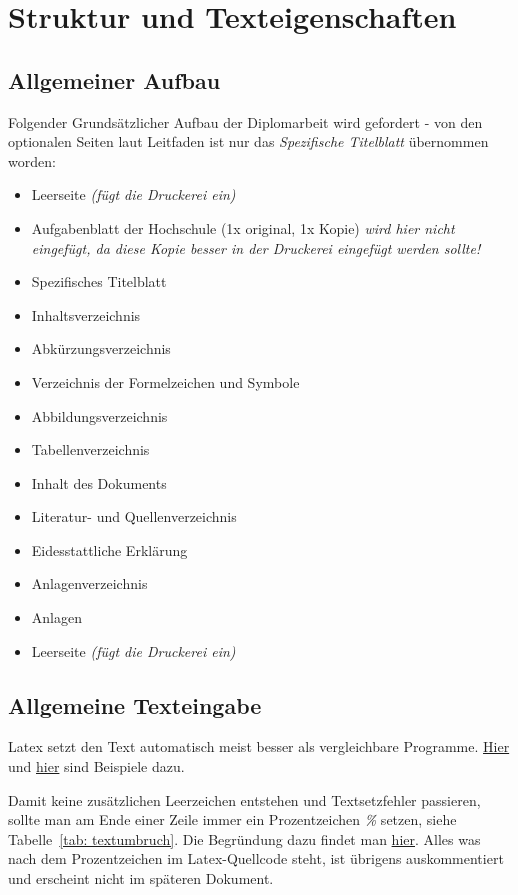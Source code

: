 \chapter{Struktur und Texteigenschaften}%
\section{Allgemeiner Aufbau}%
Folgender Grundsätzlicher Aufbau der Diplomarbeit wird gefordert - von den optionalen Seiten laut Leitfaden ist nur das \emph{Spezifische Titelblatt} übernommen worden:%
\begin{itemize}%
 \item Leerseite \emph{(fügt die Druckerei ein)}%
 \item Aufgabenblatt der Hochschule (1x original, 1x Kopie) \emph{wird hier nicht eingefügt, da diese Kopie besser in der Druckerei eingefügt werden sollte!}%
 \item Spezifisches Titelblatt%
 \item Inhaltsverzeichnis%
 \item Abkürzungsverzeichnis%
 \item Verzeichnis der Formelzeichen und Symbole%
 \item Abbildungsverzeichnis%
 \item Tabellenverzeichnis%
 \item Inhalt des Dokuments%
 \item Literatur- und Quellenverzeichnis%
 \item Eidesstattliche Erklärung%
 \item Anlagenverzeichnis%
 \item Anlagen%
 \item Leerseite \emph{(fügt die Druckerei ein)}%
\end{itemize}%
%
\section{Allgemeine Texteingabe}%
Latex setzt den Text automatisch meist besser als vergleichbare Programme. \href{https://tex.stackexchange.com/questions/110133/visual-comparison-between-latex-and-word-output-hyphenation-typesetting-ligat#110140}{Hier} und \href{http://www.rtznet.nl/zink/latex.php}{hier} sind Beispiele dazu.%

Damit keine zusätzlichen Leerzeichen entstehen und Textsetzfehler passieren, sollte man am Ende einer Zeile immer ein Prozentzeichen \emph{\%} setzen, siehe Tabelle~\ref{tab: textumbruch}. Die Begründung dazu findet man \href{https://tex.stackexchange.com/questions/7453/what-is-the-use-of-percent-signs-at-the-end-of-lines#7459}{hier}. Alles was nach dem Prozentzeichen im Latex-Quellcode steht, ist übrigens auskommentiert und erscheint nicht im späteren Dokument.%

